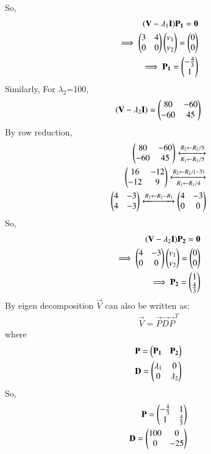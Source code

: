 \documentclass[journal,12pt,twocolumn]{IEEEtran}
\begin{document}
So, 
\begin{align}
(\mathbf{V} -\lambda_1\mathbf{I})\mathbf{P_1} = \mathbf{0}\\
\implies \begin{pmatrix}3 & 4\\0 & 0\end{pmatrix} \begin{pmatrix}v_1\\v_2\end{pmatrix} = \begin{pmatrix}0\\0\end{pmatrix}\\
\implies \mathbf{P_1} = \begin{pmatrix}-\frac{4}{3}\\1\end{pmatrix}
\end{align}
Similarly,
For $\lambda_2$=100,
\begin{align}
(\mathbf{V} -\lambda_2\mathbf{I}) = \begin{pmatrix}80 & -60\\-60 & 45\end{pmatrix}
\end{align}
By row reduction,
\begin{align}
\begin{pmatrix}80 & -60\\-60 & 45\end{pmatrix}\xleftrightarrow[R_1\leftarrow R_1 /5]{R_2\leftarrow R_2/5}\\
\begin{pmatrix}16 & -12\\-12 & 9\end{pmatrix}\xleftrightarrow[R_1\leftarrow R_1 /4]{R_2\leftarrow R_2/(-3)}\\
\begin{pmatrix}4 & -3\\4 & -3\end{pmatrix}\xleftrightarrow[]{R_2\leftarrow R_2-R_1}\begin{pmatrix}4 & -3\\0 & 0\end{pmatrix}
\end{align}
So, 
\begin{align}
(\mathbf{V} -\lambda_2\mathbf{I})\mathbf{P_2} = \mathbf{0}\\
\implies \begin{pmatrix}4 & -3\\0 & 0\end{pmatrix} \begin{pmatrix}v_1\\v_2\end{pmatrix} = \begin{pmatrix}0\\0\end{pmatrix}\\
\implies \mathbf{P_2} = \begin{pmatrix}1\\ \frac{4}{3}\end{pmatrix}
\end{align}
By eigen decomposition $\vec{V}$ can also be written as:
\begin{align}
\vec{V} = \vec{P}\vec{D}\vec{P}^T
\end{align}
where 
\begin{align}
\mathbf{P} = \begin{pmatrix}\mathbf{P_1} & \mathbf{P_2}\end{pmatrix}\\
\mathbf{D} =\begin{pmatrix}\lambda_1 & 0\\0 & \lambda_2\end{pmatrix}
\end{align}
So, 
\begin{align}
\mathbf{P} = \begin{pmatrix}-\frac{4}{3} & 1\\1 & \frac{4}{3}\end{pmatrix}\\
\mathbf{D} =\begin{pmatrix}100 & 0\\0 & -25\end{pmatrix}
\end{align}
\end{document}
